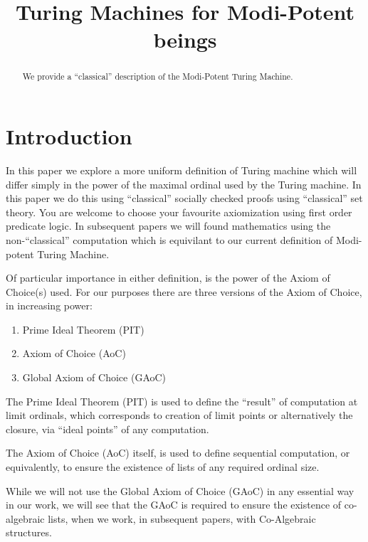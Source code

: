 \documentclass[a4paper,openany]{amsbook}
\begin{document}
\frontmatter
\sloppy

\title[Modi-Potent-Turing]{Turing Machines for Modi-Potent beings}

%

\begin{abstract}
We provide a ``classical'' description of the Modi-Potent Turing Machine.
\end{abstract} 
\maketitle 
\tableofcontents 
\mainmatter


\section{Introduction}

In this paper we explore a more uniform definition of Turing machine which will
differ simply in the power of the maximal ordinal used by the Turing machine. In
this paper we do this using ``classical'' socially checked proofs using
``classical'' set theory. You are welcome to choose your favourite axiomization
using first order predicate logic. In subsequent papers we will found
mathematics using the non-``classical'' computation which is equivilant to our
current definition of Modi-potent Turing Machine.

Of particular importance in either definition, is the power of the Axiom of
Choice(s) used. For our purposes there are three versions of the Axiom of
Choice, in increasing power:
%
\begin{enumerate}
\item Prime Ideal Theorem (PIT)
\item Axiom of Choice (AoC)
\item Global Axiom of Choice (GAoC)
\end{enumerate}

The Prime Ideal Theorem (PIT) is used to define the ``result'' of computation at
limit ordinals, which corresponds to creation of limit points or alternatively
the closure, via ``ideal points'' of any computation.

The Axiom of Choice (AoC) itself, is used to define sequential computation, or
equivalently, to ensure the existence of lists of any required ordinal size.

While we will not use the Global Axiom of Choice (GAoC) in any essential way in
our work, we will see that the GAoC is required to ensure the existence of
co-algebraic lists, when we work, in subsequent papers, with Co-Algebraic
structures.



\end{document}
